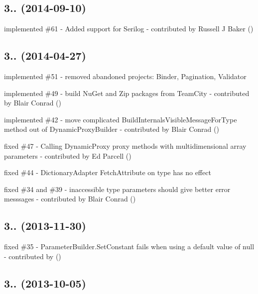\subsection*{3.. (2014-\/09-\/10)}


\begin{DoxyItemize}
\item implemented \#61 -\/ Added support for Serilog -\/ contributed by Russell J Baker ()
\end{DoxyItemize}

\subsection*{3.. (2014-\/04-\/27)}


\begin{DoxyItemize}
\item implemented \#51 -\/ removed abandoned projects\+: Binder, Pagination, Validator
\item implemented \#49 -\/ build Nu\+Get and Zip packages from Team\+City -\/ contributed by Blair Conrad ()
\item implemented \#42 -\/ move complicated Build\+Internals\+Visible\+Message\+For\+Type method out of Dynamic\+Proxy\+Builder -\/ contributed by Blair Conrad ()
\item fixed \#47 -\/ Calling Dynamic\+Proxy proxy methods with multidimensional array parameters -\/ contributed by Ed Parcell ()
\item fixed \#44 -\/ Dictionary\+Adapter Fetch\+Attribute on type has no effect
\item fixed \#34 and \#39 -\/ inaccessible type parameters should give better error messsages -\/ contributed by Blair Conrad ()
\end{DoxyItemize}

\subsection*{3.. (2013-\/11-\/30)}


\begin{DoxyItemize}
\item fixed \#35 -\/ Parameter\+Builder.\+Set\+Constant fails when using a default value of null -\/ contributed by ()
\end{DoxyItemize}

\subsection*{3.. (2013-\/10-\/05)}


